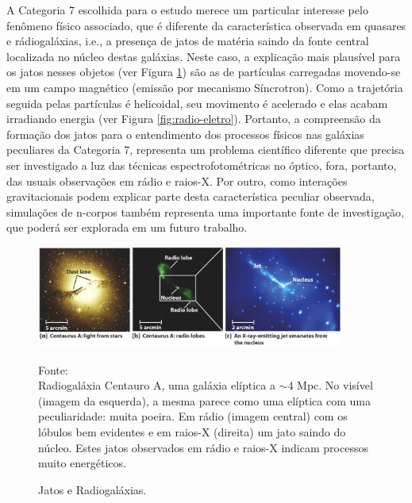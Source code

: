 A Categoria 7 escolhida para o estudo merece um particular interesse pelo fenômeno físico associado, que é diferente da característica observada em quasares e rádiogaláxias, i.e., a presença de jatos de matéria saindo da fonte central localizada no núcleo destas galáxias. Neste caso, a explicação mais plausível para os jatos nesses objetos (ver Figura \ref{fig:radios}) são as de partículas carregadas movendo-se em um campo magnético (emissão por mecanismo Síncrotron). Como a trajetória seguida pelas partículas é helicoidal, seu movimento é acelerado e elas acabam irradiando energia (ver Figura \ref{fig:radio-eletro}). Portanto, a compreensão da formação dos jatos para o entendimento dos processos físicos nas galáxias peculiares da Categoria 7, representa um problema científico diferente que precisa ser investigado a luz das técnicas espectrofotométricas no óptico, fora, portanto, das usuais observações em rádio e raios-X. Por outro, como interações gravitacionais podem explicar parte desta característica peculiar observada, simulações de n-corpos também representa uma importante fonte de investigação, que poderá ser explorada em um futuro trabalho.

  \begin{figure}[!htb]
	\centering	
    \caption{Jatos e Radiogaláxias.}
    \includegraphics[width=0.9\textwidth]{figuras/radiogalaxia.jpg}
   	\begin{center}
        \normalsize Fonte: \cite{freedman_kaufmann_2008}\\Radiogaláxia Centauro A, uma galáxia elíptica a $\sim$4 Mpc. No visível (imagem da esquerda), a mesma parece como uma elíptica com uma peculiaridade: muita poeira. Em rádio (imagem central) com os lóbulos bem evidentes e em raios-X (direita) um jato saindo do núcleo.   Estes jatos observados em rádio e raios-X indicam processos muito energéticos.
    \end{center}
	\label{fig:radios}
\end{figure}

